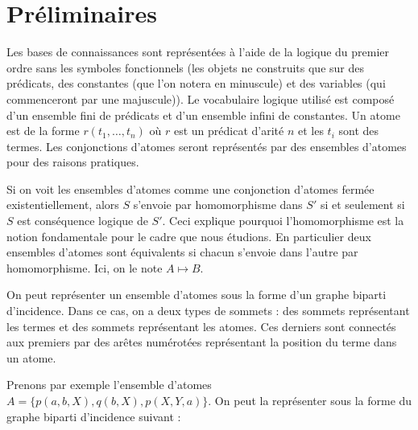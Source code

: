 \section{Préliminaires}\label{sec:preliminaires}

Les bases de connaissances sont représentées à l'aide de la logique du premier ordre sans les symboles fonctionnels (les objets ne construits que sur des prédicats, des constantes (que l'on notera en minuscule) et des variables (qui commenceront par une majuscule)). Le vocabulaire logique utilisé est composé d'un ensemble fini de prédicats et d'un ensemble infini de constantes. Un atome est de la forme $r(t_1, \ldots, t_n)$ où $r$ est un prédicat d'arité $n$ et les $t_i$ sont des termes. Les conjonctions d'atomes seront représentés par des ensembles d'atomes pour des raisons pratiques.

\begin{definition}
Si on voit les ensembles d'atomes comme une conjonction d'atomes fermée existentiellement, alors $S$ s'envoie par homomorphisme dans $S'$ si et seulement si $S$ est conséquence logique de $S'$. Ceci explique pourquoi l'homomorphisme est la notion fondamentale pour le cadre que nous étudions. En particulier deux ensembles d'atomes sont équivalents si chacun s'envoie dans l'autre par homomorphisme. Ici, on le note $A \mapsto B$.
\end{definition}

On peut représenter un ensemble d'atomes sous la forme d'un graphe biparti d'incidence. Dans ce cas, on a deux types de sommets : des sommets représentant les termes et des sommets représentant les atomes. Ces derniers sont connectés aux premiers par des arêtes numérotées représentant la position du terme dans un atome.
\par Prenons par exemple l'ensemble d'atomes $A = \{p(a,b,X), q(b,X), p(X,Y,a)\}$. On peut la représenter sous la forme du graphe biparti d'incidence suivant : \par

